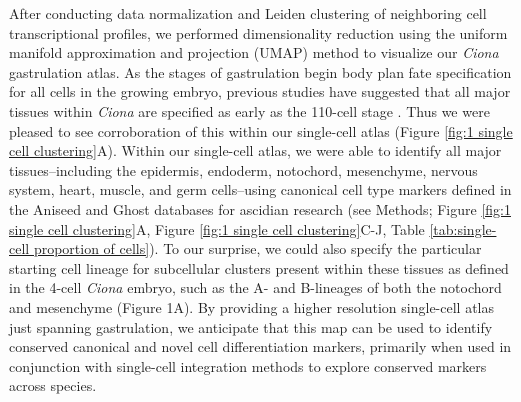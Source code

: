 After conducting data normalization and Leiden clustering of neighboring cell transcriptional profiles, we performed dimensionality reduction using the uniform manifold approximation and projection (UMAP) method to visualize our \textit{Ciona} gastrulation atlas. As the stages of gastrulation begin body plan fate specification for all cells in the growing embryo, previous studies have suggested that all major tissues within \textit{Ciona} are specified as early as the 110-cell stage \cite{satoh2014,cao2019,imai2006,imai2004}. Thus we were pleased to see corroboration of this within our single-cell atlas (Figure \ref{fig:1 single cell clustering}A). Within our single-cell atlas, we were able to identify all major tissues–including the epidermis, endoderm, notochord, mesenchyme, nervous system, heart, muscle, and germ cells–using canonical cell type markers defined in the Aniseed and Ghost databases for ascidian research (see Methods; Figure \ref{fig:1 single cell clustering}A, Figure \ref{fig:1 single cell clustering}C-J, Table \ref{tab:single-cell proportion of cells}). To our surprise, we could also specify the particular starting cell lineage for subcellular clusters present within these tissues as defined in the 4-cell \textit{Ciona} embryo, such as the A- and B-lineages of both the notochord and mesenchyme (Figure 1A). By providing a higher resolution single-cell atlas just spanning gastrulation, we anticipate that this map can be used to identify conserved canonical and novel cell differentiation markers, primarily when used in conjunction with single-cell integration methods to explore conserved markers across species.

